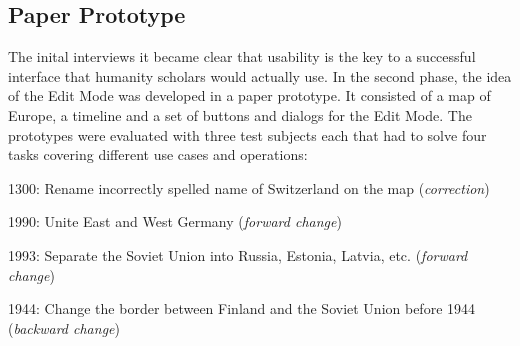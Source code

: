 


\subsection{Paper Prototype} %
\label{sub:paper_prototype}

The inital interviews it became clear that usability is the key to a successful interface that humanity scholars would actually use. In the second phase, the idea of the Edit Mode was developed in a paper prototype. It consisted of a map of Europe, a timeline and a set of buttons and dialogs for the Edit Mode. The prototypes were evaluated with three test subjects each that had to solve four tasks covering different use cases and operations:
\begin{compactenum}
  \item 1300: Rename incorrectly spelled name of Switzerland on the map (\emph{correction})
  \item 1990: Unite East and West Germany (\emph{forward change})
  \item 1993: Separate the Soviet Union into Russia, Estonia, Latvia, etc. (\emph{forward change})
  \item 1944: Change the border between Finland and the Soviet Union before 1944 (\emph{backward change})
\end{compactenum}

